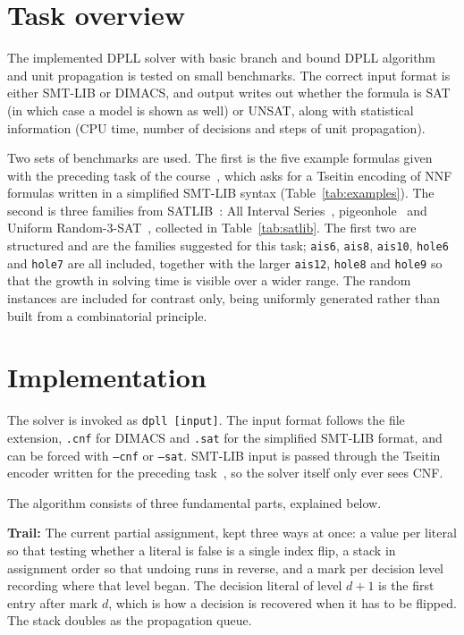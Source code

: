 \documentclass[11pt,a4paper]{article}
\begin{document}
\makereporttitle

\section{Task overview}

The implemented DPLL solver with basic branch and bound DPLL algorithm and unit propagation is
tested on small benchmarks. The correct input format is either SMT-LIB or DIMACS, and output writes
out whether the formula is SAT (in which case a model is shown as well) or UNSAT, along with statistical
information (CPU time, number of decisions and steps of unit propagation).

Two sets of benchmarks are used. The first is the five example formulas given
with the preceding task of the course~\cite{task1}, which asks for a Tseitin
encoding of NNF formulas written in a simplified SMT-LIB syntax
(Table~\ref{tab:examples}). The second is three families from
SATLIB~\cite{satlib}: All Interval Series~\cite{ais}, pigeonhole~\cite{phole}
and Uniform Random-3-SAT~\cite{uf}, collected in Table~\ref{tab:satlib}.
The first two are structured and are the
families suggested for this task; \texttt{ais6}, \texttt{ais8}, \texttt{ais10},
\texttt{hole6} and \texttt{hole7} are all included, together with the larger
\texttt{ais12}, \texttt{hole8} and \texttt{hole9} so that the growth in solving
time is visible over a wider range. The random instances are included for
contrast only, being uniformly generated rather than built from a combinatorial
principle.

\section{Implementation}

The solver is invoked as \texttt{dpll [input]}. The input format follows the
file extension, \texttt{.cnf} for DIMACS and \texttt{.sat} for the simplified
SMT-LIB format, and can be forced with \texttt{--cnf} or \texttt{--sat}.
SMT-LIB input is passed through the Tseitin encoder written for the preceding
task~\cite{task1}, so the solver itself only ever sees CNF.

The algorithm consists of three fundamental parts, explained below.

\textbf{Trail: } The current partial assignment, kept three ways at once: a value
per literal so that testing whether a literal is false is a single index flip, a
stack in assignment order so that undoing runs in reverse, and a mark per
decision level recording where that level began. The decision literal of level
$d+1$ is the first entry after mark $d$, which is how a decision is recovered
when it has to be flipped. The stack doubles as the propagation queue.
\end{document}
